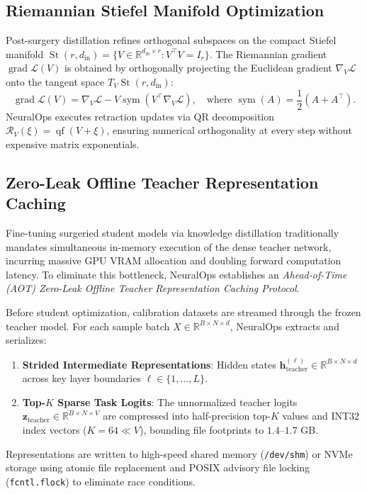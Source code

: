 \documentclass{article}
\begin{document}
\subsection{Riemannian Stiefel Manifold Optimization}
Post-surgery distillation refines orthogonal subspaces on the compact Stiefel manifold $\operatorname{St}(r, d_{\text{in}}) = \{V \in \mathbb{R}^{d_{\text{in}} \times r} : V^\top V = I_r\}$. The Riemannian gradient $\operatorname{grad} \mathcal{L}(V)$ is obtained by orthogonally projecting the Euclidean gradient $\nabla_V \mathcal{L}$ onto the tangent space $T_V \operatorname{St}(r, d_{\text{in}})$:
\begin{equation}
    \operatorname{grad} \mathcal{L}(V) = \nabla_V \mathcal{L} - V \operatorname{sym}(V^\top \nabla_V \mathcal{L}), \quad \text{where } \operatorname{sym}(A) = \frac{1}{2}(A + A^\top).
\end{equation}
NeuralOps executes retraction updates via QR decomposition $\mathcal{R}_V(\xi) = \operatorname{qf}(V + \xi)$, ensuring numerical orthogonality at every step without expensive matrix exponentials.

\subsection{Zero-Leak Offline Teacher Representation Caching}
\label{sec:offline_teacher_cache}
Fine-tuning surgeried student models via knowledge distillation traditionally mandates simultaneous in-memory execution of the dense teacher network, incurring massive GPU VRAM allocation and doubling forward computation latency. To eliminate this bottleneck, NeuralOps establishes an \emph{Ahead-of-Time (AOT) Zero-Leak Offline Teacher Representation Caching Protocol}.

Before student optimization, calibration datasets are streamed through the frozen teacher model. For each sample batch $X \in \mathbb{R}^{B \times N \times d}$, NeuralOps extracts and serializes:
\begin{enumerate}
    \item \textbf{Strided Intermediate Representations}: Hidden states $\mathbf{h}_{\text{teacher}}^{(\ell)} \in \mathbb{R}^{B \times N \times d}$ across key layer boundaries $\ell \in \{1, \dots, L\}$.
    \item \textbf{Top-$K$ Sparse Task Logits}: The unnormalized teacher logits $\mathbf{z}_{\text{teacher}} \in \mathbb{R}^{B \times N \times V}$ are compressed into half-precision top-$K$ values and INT32 index vectors ($K=64 \ll V$), bounding file footprints to $1.4\text{--}1.7\text{ GB}$.
\end{enumerate}
Representations are written to high-speed shared memory (\texttt{/dev/shm}) or NVMe storage using atomic file replacement and POSIX advisory file locking (\texttt{fcntl.flock}) to eliminate race conditions.
\end{document}
